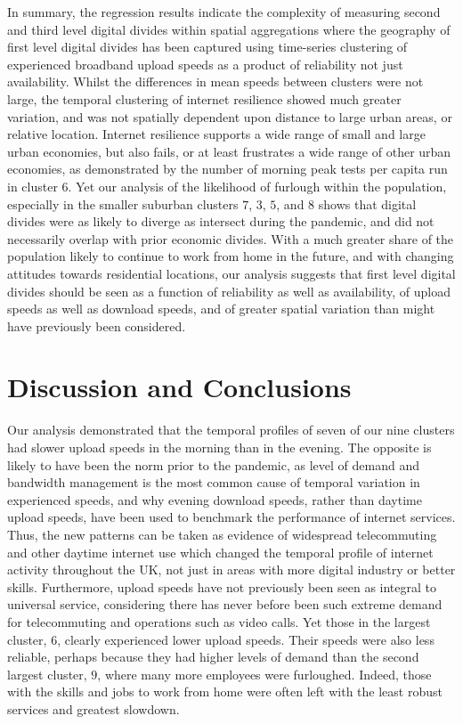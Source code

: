 \documentclass[]{interact}
\theoremstyle{plain}%
\theoremstyle{definition}
\theoremstyle{remark}
\begin{document}
In summary, the regression results indicate the complexity of measuring
second and third level digital divides within spatial aggregations where
the geography of first level digital divides has been captured using
time-series clustering of experienced broadband upload speeds as a
product of reliability not just availability. Whilst the differences in
mean speeds between clusters were not large, the temporal clustering of
internet resilience showed much greater variation, and was not spatially
dependent upon distance to large urban areas, or relative location.
Internet resilience supports a wide range of small and large urban
economies, but also fails, or at least frustrates a wide range of other
urban economies, as demonstrated by the number of morning peak tests per
capita run in cluster \(6\). Yet our analysis of the likelihood of
furlough within the population, especially in the smaller suburban
clusters \(7\), \(3\), \(5\), and \(8\) shows that digital divides were
as likely to diverge as intersect during the pandemic, and did not
necessarily overlap with prior economic divides. With a much greater
share of the population likely to continue to work from home in the
future, and with changing attitudes towards residential locations, our
analysis suggests that first level digital divides should be seen as a
function of reliability as well as availability, of upload speeds as
well as download speeds, and of greater spatial variation than might
have previously been considered.

\hypertarget{sec:5}{%
\section{Discussion and Conclusions}\label{sec:5}}

Our analysis demonstrated that the temporal profiles of seven of our
nine clusters had slower upload speeds in the morning than in the
evening. The opposite is likely to have been the norm prior to the
pandemic, as level of demand and bandwidth management is the most common
cause of temporal variation in experienced speeds, and why evening
download speeds, rather than daytime upload speeds, have been used to
benchmark the performance of internet services. Thus, the new patterns
can be taken as evidence of widespread telecommuting and other daytime
internet use which changed the temporal profile of internet activity
throughout the UK, not just in areas with more digital industry or
better skills. Furthermore, upload speeds have not previously been seen
as integral to universal service, considering there has never before
been such extreme demand for telecommuting and operations such as video
calls. Yet those in the largest cluster, \(6\), clearly experienced
lower upload speeds. Their speeds were also less reliable, perhaps
because they had higher levels of demand than the second largest
cluster, \(9\), where many more employees were furloughed. Indeed, those
with the skills and jobs to work from home were often left with the
least robust services and greatest slowdown.
\end{document}
